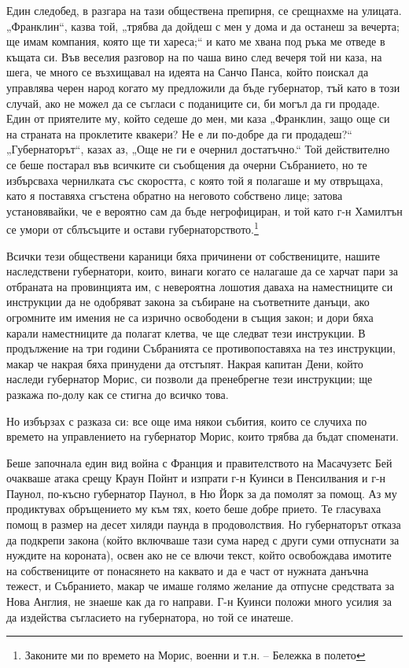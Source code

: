 \documentclass[12pt]{book}
\begin{document}
Един следобед, в разгара на тази обществена препирня, се срещнахме на улицата. „Франклин“, казва той, „трябва да дойдеш с мен у дома и да останеш за вечерта; ще имам компания, която ще ти хареса;“ и като ме хвана под ръка ме отведе в къщата си. Във веселия разговор на по чаша вино след вечеря той ни каза, на шега, че много се възхищавал на идеята на Санчо Панса, който поискал да управлява черен народ когато му предложили да бъде губернатор, тъй като в този случай, ако не можел да се съгласи с поданиците си, би могъл да ги продаде. Един от приятелите му, който седеше до мен, ми каза „Франклин, защо още си на страната на проклетите квакери? Не е ли по-добре да ги продадеш?“ „Губернаторът“, казах аз, „Още не ги е очернил достатъчно.“ Той действително се беше постарал във всичките си съобщения да очерни Събранието, но те избърсваха чернилката със скоростта, с която той я полагаше и му отвръщаха, като я поставяха сгъстена обратно на неговото собствено лице; затова установявайки, че е вероятно сам да бъде негрофициран, и той като г-н Хамилтън се умори от сблъсъците и остави губернаторството.\footnote{Законите ми по времето на Морис, военни и т.н. – Бележка в полето}

Всички тези обществени караници бяха причинени от собствениците, нашите наследствени губернатори, които, винаги когато се налагаше да се харчат пари за отбраната на провинцията им, с невероятна лошотия даваха на наместниците си инструкции да не одобряват закона за събиране на съответните данъци, ако огромните им имения не са изрично освободени в същия закон; и дори бяха карали наместниците да полагат клетва, че ще следват тези инструкции. В продължение на три години Събранията се противопоставяха на тез инструкции, макар че накрая бяха принудени да отстъпят. Накрая капитан Дени, който наследи губернатор Морис, си позволи да пренебрегне тези инструкции; ще разкажа по-долу как се стигна до всичко това.

Но избързах с разказа си: все още има някои събития, които се случиха по времето на управлението на губернатор Морис, които трябва да бъдат споменати. 

Беше започнала един вид война с Франция и правителството на Масачузетс Бей очакваше атака срещу Краун Пойнт и изпрати г-н Куинси в Пенсилвания и г-н Паунол, по-късно губернатор Паунол, в Ню Йорк за да помолят за помощ. Аз му продиктувах обръщението му към тях, което беше добре прието. Те гласуваха помощ в размер на десет хиляди паунда в продоволствия. Но губернаторът отказа да подкрепи закона (който включваше тази сума наред с други суми отпуснати за нуждите на короната), освен ако не се влючи текст, който освобождава имотите на собствениците от понасянето на каквато и да е част от нужната данъчна тежест, и Събранието, макар че имаше голямо желание да отпусне средствата за Нова Англия, не знаеше как да го направи. Г-н Куинси положи много усилия за да издейства съгласието на губернатора, но той се инатеше. 
\end{document}
